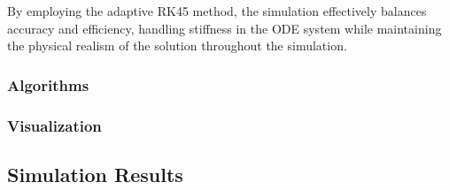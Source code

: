 By employing the adaptive RK45 method, the simulation effectively balances accuracy and efficiency, handling stiffness in the ODE system while maintaining the physical realism of the solution throughout the simulation.
\subsubsection{Algorithms}

\subsubsection{Visualization}
\subsection{Simulation Results}